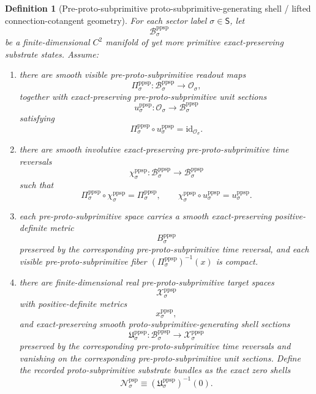 \documentclass[11pt]{article}
\newcommand{\SectorSet}{\mathsf S}
\newcommand{\ObjClass}[1]{\mathcal O_{#1}}
\newcommand{\PreProtoSubprimTarget}[1]{\mathcal X_{#1}^{\mathrm{ppsp}}}
\newcommand{\PreProtoSubprimTargetMetric}[1]{x_{#1}^{\mathrm{ppsp}}}
\newcommand{\ProtoSubprimSpace}[1]{\mathcal N_{#1}^{\mathrm{psp}}}
\newcommand{\PreProtoSubprimSpace}[1]{\mathcal B_{#1}^{\mathrm{ppsp}}}
\newcommand{\PreProtoSubprimRead}[1]{\Pi_{#1}^{\mathrm{ppsp}}}
\newcommand{\PreProtoSubprimUnit}[1]{u_{#1}^{\mathrm{ppsp}}}
\newcommand{\PreProtoSubprimTimeRev}[1]{\chi_{#1}^{\mathrm{ppsp}}}
\newcommand{\PreProtoSubprimMetric}[1]{B_{#1}^{\mathrm{ppsp}}}
\newcommand{\PreProtoSubprimSection}[1]{\mathfrak U_{#1}^{\mathrm{ppsp}}}
\newtheorem{definition}{Definition}
\begin{document}
\begin{definition}[Pre-proto-subprimitive proto-subprimitive-generating shell / lifted connection-cotangent geometry]
\label{def:preprotosubprimitive_geometry}
For each sector label \(\sigma\in\SectorSet\), let
\[
\PreProtoSubprimSpace{\sigma}
\]
be a finite-dimensional \(C^2\) manifold of yet more primitive exact-preserving substrate states. Assume:
\begin{enumerate}
    \item there are smooth visible pre-proto-subprimitive readout maps
    \[
    \PreProtoSubprimRead{\sigma}:\PreProtoSubprimSpace{\sigma}\to\ObjClass{\sigma},
    \]
    together with exact-preserving pre-proto-subprimitive unit sections
    \[
    \PreProtoSubprimUnit{\sigma}:\ObjClass{\sigma}\to\PreProtoSubprimSpace{\sigma}
    \]
    satisfying
    \[
    \PreProtoSubprimRead{\sigma}\circ\PreProtoSubprimUnit{\sigma}=\mathrm{id}_{\ObjClass{\sigma}}.
    \]
    \item there are smooth involutive exact-preserving pre-proto-subprimitive time reversals
    \[
    \PreProtoSubprimTimeRev{\sigma}:\PreProtoSubprimSpace{\sigma}\to\PreProtoSubprimSpace{\sigma}
    \]
    such that
    \[
    \PreProtoSubprimRead{\sigma}\circ\PreProtoSubprimTimeRev{\sigma}=\PreProtoSubprimRead{\sigma},
    \qquad
    \PreProtoSubprimTimeRev{\sigma}\circ\PreProtoSubprimUnit{\sigma}=\PreProtoSubprimUnit{\sigma}.
    \]
    \item each pre-proto-subprimitive space carries a smooth exact-preserving positive-definite metric
    \[
    \PreProtoSubprimMetric{\sigma}
    \]
    preserved by the corresponding pre-proto-subprimitive time reversal, and each visible pre-proto-subprimitive fiber \((\PreProtoSubprimRead{\sigma})^{-1}(x)\) is compact.
    \item there are finite-dimensional real pre-proto-subprimitive target spaces
    \[
    \PreProtoSubprimTarget{\sigma}
    \]
    with positive-definite metrics
    \[
    \PreProtoSubprimTargetMetric{\sigma},
    \]
    and exact-preserving smooth proto-subprimitive-generating shell sections
    \[
    \PreProtoSubprimSection{\sigma}:\PreProtoSubprimSpace{\sigma}\to\PreProtoSubprimTarget{\sigma}
    \]
    preserved by the corresponding pre-proto-subprimitive time reversals and vanishing on the corresponding pre-proto-subprimitive unit sections. Define the recorded proto-subprimitive substrate bundles as the exact zero shells
    \begin{equation}
    \ProtoSubprimSpace{\sigma}\equiv \left(\PreProtoSubprimSection{\sigma}\right)^{-1}(0).

\end{equation}
\end{enumerate}
\end{definition}
\end{document}
